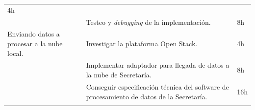 \begin{longtable}[c]{@{}lll@{}}
\begin{minipage}[t]{0.10\columnwidth}
4h
\end{minipage}
\\\noalign{\medskip}
\begin{minipage}[t]{0.28\columnwidth}\raggedright
\end{minipage} & \begin{minipage}[t]{0.62\columnwidth}\raggedright
Testeo y \emph{debugging} de la implementación.
\end{minipage} & \begin{minipage}[t]{0.10\columnwidth}\raggedright
8h
\end{minipage}
\\\noalign{\medskip}
\begin{minipage}[t]{0.28\columnwidth}\raggedright
Enviando datos a procesar a la nube local.
\end{minipage} & \begin{minipage}[t]{0.62\columnwidth}\raggedright
Investigar la plataforma Open Stack.
\end{minipage} & \begin{minipage}[t]{0.10\columnwidth}\raggedright
4h
\end{minipage}
\\\noalign{\medskip}
\begin{minipage}[t]{0.28\columnwidth}\raggedright
\end{minipage} & \begin{minipage}[t]{0.62\columnwidth}\raggedright
Implementar adaptador para llegada de datos a la nube de Secretaría.
\end{minipage} & \begin{minipage}[t]{0.10\columnwidth}\raggedright
8h
\end{minipage}
\\\noalign{\medskip}
\begin{minipage}[t]{0.28\columnwidth}\raggedright
\end{minipage} & \begin{minipage}[t]{0.62\columnwidth}\raggedright
Conseguir especificación técnica del software de procesamiento de datos
de la Secretaría.
\end{minipage} & \begin{minipage}[t]{0.10\columnwidth}\raggedright
16h
\end{minipage}
\\\noalign{\medskip}
\begin{minipage}[t]{0.28\columnwidth}\raggedright
\end{minipage} & \begin{minipage}[t]{0.62\columnwidth}\raggedright

\end{minipage}
\end{longtable}
